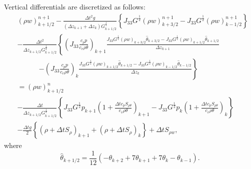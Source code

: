 Vertical differentials are discretized as follows:
\begin{align}
&
  (\rho w)_{k+1/2}^{n+1}
  -\frac{\Delta t^2 g}{(\Delta z_{k+1} + \Delta z_k) G^{\frac{1}{2}}_{k+1/2}}
  \left\{J_{33}G^{\frac{1}{2}}(\rho w)^{n+1}_{k+3/2}
        -J_{33}G^{\frac{1}{2}}(\rho w)^{n+1}_{k-1/2}\right\}
    \nonumber\\ &
  - \frac{\Delta t^2}{\Delta z_{k+1/2} G^{\frac{1}{2}}_{k+1/2}}
  \left\{
    \left(J_{33}\frac{c_pp}{c_v\rho\theta}\right)_{k+1}\frac{
    J_{33}G^{\frac{1}{2}}(\rho w)_{k+3/2}\hat{\theta}_{k+3/2}-J_{33}G^{\frac{1}{2}}(\rho w)_{k+1/2}\hat{\theta}_{k+1/2}}{\Delta z_{k+1}} \right.\nonumber\\&\:\:\:\:\:\:\:\:\:\:\:\:\:\:\left.
    -\left(J_{33}\frac{c_pp}{c_v\rho\theta}\right)_k\frac{
    J_{33}G^{\frac{1}{2}}(\rho w)_{k+1/2}\hat{\theta}_{k+1/2}-J_{33}G^{\frac{1}{2}}(\rho w)_{k-1/2}\hat{\theta}_{k-1/2}}{\Delta z_k}\right\} \nonumber\\
  &=
  (\rho w)_{k+1/2}^n \nonumber\\&
  -\frac{\Delta t}{\Delta z_{k+1/2} G^{\frac{1}{2}}_{k+1/2}} \left\{
    J_{33}G^{\frac{1}{2}} p_{k+1}\left(1+\frac{\Delta tc_pS_{\rho\theta}}{c_v\rho\theta}\right)_{k+1}
  - J_{33}G^{\frac{1}{2}} p_k   \left(1+\frac{\Delta tc_pS_{\rho\theta}}{c_v\rho\theta}\right)_k \right\}\nonumber\\ &
  -\frac{\Delta t g}{2} \left\{ (\rho+\Delta t S_\rho)_{k+1}+(\rho+\Delta t S_\rho)_k\right\} + \Delta t S_{\rho w},
\end{align}
where
\begin{equation}
  \hat{\theta}_{k+1/2} = \frac{1}{12}\left(-\theta_{k+2}+7\theta_{k+1}+7\theta_k-\theta_{k-1}\right).
\end{equation}

